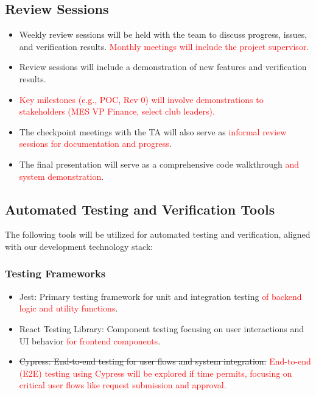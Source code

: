 \documentclass[12pt, titlepage]{article}
\begin{document}
\subsection*{Review Sessions}
\begin{itemize}
  \item Weekly review sessions will be held with the team to discuss progress, issues, and verification results. \textcolor{red}{Monthly meetings will include the project supervisor.}
  \item Review sessions will include a demonstration of new features and verification results.
  \item \textcolor{red}{Key milestones (e.g., POC, Rev 0) will involve demonstrations to stakeholders (MES VP Finance, select club leaders).}
  \item The checkpoint meetings with the TA will also serve as \textcolor{red}{informal review sessions for documentation and progress}.
  \item The final presentation will serve as a comprehensive code walkthrough \textcolor{red}{and system demonstration}.
\end{itemize}

\subsection{Automated Testing and Verification Tools}
The following tools will be utilized for automated testing and verification, aligned with our development technology stack:

\subsubsection*{Testing Frameworks}
\begin{itemize}
    \item Jest: Primary testing framework for unit and integration testing \textcolor{red}{of backend logic and utility functions}.
    \item React Testing Library: Component testing focusing on user interactions and UI behavior \textcolor{red}{for frontend components}.
    \item \sout{Cypress: End-to-end testing for user flows and system integration.} \textcolor{red}{End-to-end (E2E) testing using Cypress will be explored if time permits, focusing on critical user flows like request submission and approval.}
\end{itemize}
\end{document}
